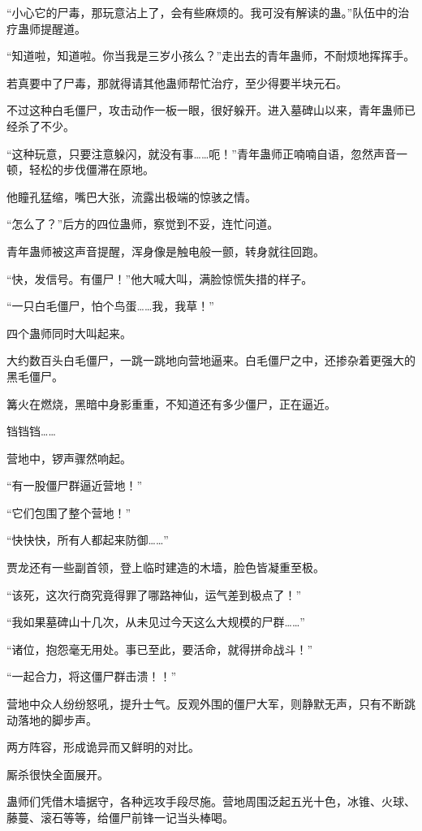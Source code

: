 \begin{this_body}
“小心它的尸毒，那玩意沾上了，会有些麻烦的。我可没有解读的蛊。”队伍中的治疗蛊师提醒道。

“知道啦，知道啦。你当我是三岁小孩么？”走出去的青年蛊师，不耐烦地挥挥手。

若真要中了尸毒，那就得请其他蛊师帮忙治疗，至少得要半块元石。

不过这种白毛僵尸，攻击动作一板一眼，很好躲开。进入墓碑山以来，青年蛊师已经杀了不少。

“这种玩意，只要注意躲闪，就没有事……呃！”青年蛊师正喃喃自语，忽然声音一顿，轻松的步伐僵滞在原地。

他瞳孔猛缩，嘴巴大张，流露出极端的惊骇之情。

“怎么了？”后方的四位蛊师，察觉到不妥，连忙问道。

青年蛊师被这声音提醒，浑身像是触电般一颤，转身就往回跑。

“快，发信号。有僵尸！”他大喊大叫，满脸惊慌失措的样子。

“一只白毛僵尸，怕个鸟蛋……我，我草！”

四个蛊师同时大叫起来。

大约数百头白毛僵尸，一跳一跳地向营地逼来。白毛僵尸之中，还掺杂着更强大的黑毛僵尸。

篝火在燃烧，黑暗中身影重重，不知道还有多少僵尸，正在逼近。

铛铛铛……

营地中，锣声骤然响起。

“有一股僵尸群逼近营地！”

“它们包围了整个营地！”

“快快快，所有人都起来防御……”

贾龙还有一些副首领，登上临时建造的木墙，脸色皆凝重至极。

“该死，这次行商究竟得罪了哪路神仙，运气差到极点了！”

“我如果墓碑山十几次，从未见过今天这么大规模的尸群……”

“诸位，抱怨毫无用处。事已至此，要活命，就得拼命战斗！”

“一起合力，将这僵尸群击溃！！”

营地中众人纷纷怒吼，提升士气。反观外围的僵尸大军，则静默无声，只有不断跳动落地的脚步声。

两方阵容，形成诡异而又鲜明的对比。

厮杀很快全面展开。

蛊师们凭借木墙据守，各种远攻手段尽施。营地周围泛起五光十色，冰锥、火球、藤蔓、滚石等等，给僵尸前锋一记当头棒喝。


\end{this_body}
